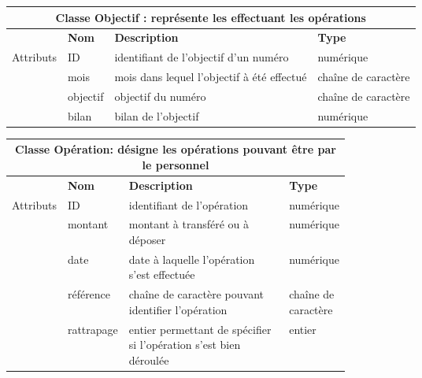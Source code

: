 		
		\begin{center}
			{\renewcommand{\arraystretch}{1.5}\begin{tabularx}{\textwidth}{|l|l|l|X|}
					\hline
					\multicolumn{4}{|c|}{\textbf{Classe Objectif : représente les effectuant les opérations}} \\
					
					\hline
					
					& \textbf{Nom} & \textbf{Description} & \textbf{Type} \\
					\multirow{3}{*}{Attributs} & ID & identifiant de l'objectif d'un numéro & numérique \\
					
					& mois & mois dans lequel l'objectif à été effectué &  chaîne de caractère \\
					
					& objectif & objectif du numéro &chaîne de caractère \\
					
					& bilan & bilan de l'objectif & numérique \\
					
					\hline
			\end{tabularx}}
			\label{classe objectif}
		\end{center}
	
		\begin{center}
			{\renewcommand{\arraystretch}{2}\begin{tabularx}{\textwidth}{|l|l|p{0.5\linewidth}|X|}
					\hline
					\multicolumn{4}{|c|}{\textbf{Classe Opération: désigne les opérations pouvant être par le personnel}} \\
					
					\hline
					
					& \textbf{Nom} & \textbf{Description} & \textbf{Type} \\
					\multirow{3}{*}{Attributs} & ID & identifiant de l'opération & numérique \\
					
					& montant & montant à transféré ou à déposer & numérique\\
					
					& date & date à laquelle l'opération s'est effectuée & numérique \\
					
					& référence & chaîne de caractère pouvant identifier l'opération & chaîne de caractère\\
					
					& rattrapage & entier permettant de spécifier si l'opération s'est bien déroulée & entier \\
					
					\hline
			\end{tabularx}}
			\label{table5}
		\end{center}
		
